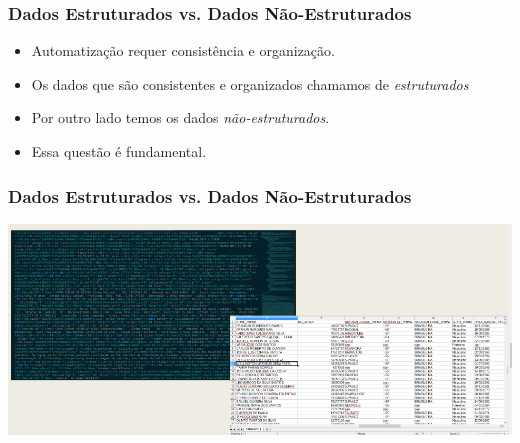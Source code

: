\documentclass{beamer}
\begin{document}
\begin{frame}
\frametitle{Dados Estruturados vs. Dados Não-Estruturados}
\begin{itemize}
\item <1-> Automatização requer consistência e organização.\\
\item <2-> Os dados que são consistentes e organizados chamamos de \textit{estruturados}\\
\item <3-> Por outro lado temos os dados \textit{não-estruturados}.\\
\item <4> Essa questão é fundamental.\\
\end{itemize}
\end{frame}
\begin{frame}
\frametitle{Dados Estruturados vs. Dados Não-Estruturados}
\includegraphics[width=\textwidth]{DadosEstr.png}
\end{frame}
\end{document}
